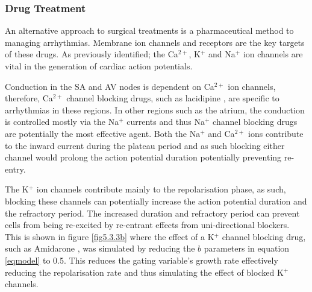         \subsubsection{Drug Treatment}
        An alternative approach to surgical treatments is a pharmaceutical method to managing arrhythmias. Membrane ion channels and receptors are the key targets of these drugs. As previously identified; the Ca$^{2+}$, K$^+$ and Na$^+$ ion channels are vital in the generation of cardiac action potentials. \par 
        Conduction in the SA and AV nodes is dependent on Ca$^{2+}$ ion channels, therefore, Ca$^{2+}$ channel blocking drugs, such as lacidipine \citep{drugs}, are specific to arrhythmias in these regions. In other regions such as the atrium, the conduction is controlled mostly via the Na$^+$ currents and thus Na$^+$ channel blocking drugs are potentially the most effective agent. Both the Na$^+$ and Ca$^{2+}$ ions contribute to the inward current during the plateau period and as such blocking either channel would prolong the action potential duration potentially preventing re-entry.\par
        The K$^+$ ion channels contribute mainly to the repolarisation phase, as such, blocking these channels can potentially increase the action potential duration and the refractory period. The increased duration and refractory period can prevent cells from being re-excited by re-entrant effects from uni-directional blockers. This is shown in figure \ref{fig5.3.3b} where the effect of a K$^+$ channel blocking drug, such as Amidarone \citep{drugs}, was simulated by reducing the $b$ parameters in equation \ref{eqmodel} to 0.5. This reduces the gating variable's growth rate effectively reducing the repolarisation rate and thus simulating the effect of blocked K$^+$ channels.\par

